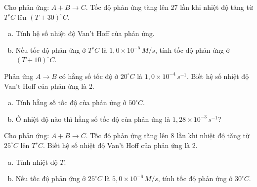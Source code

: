 \documentclass[Main.tex]{subfiles}
\begin{document}
\begin{bt}
	Cho phản ứng: $A + B \rightarrow C$. Tốc độ phản ứng tăng lên 27 lần khi nhiệt độ tăng từ $T^\circ C$ lên $(T+30)^\circ C$.
	\begin{enumerate}[a)]
		\item Tính hệ số nhiệt độ Van't Hoff của phản ứng.
		\item Nếu tốc độ phản ứng ở $T^\circ C$ là $1{,}0 \times 10^{-5} \, M/s$, tính tốc độ phản ứng ở $(T+10)^\circ C$.
	\end{enumerate}
\end{bt}

\begin{bt}
	Phản ứng $A \rightarrow B$ có hằng số tốc độ ở $20^\circ C$ là $1{,}0 \times 10^{-4} \, s^{-1}$. Biết hệ số nhiệt độ Van't Hoff của phản ứng là 2.
	\begin{enumerate}[a)]
		\item Tính hằng số tốc độ của phản ứng ở $50^\circ C$.
		\item Ở nhiệt độ nào thì hằng số tốc độ của phản ứng là $1{,}28 \times 10^{-3} \, s^{-1}$?
	\end{enumerate}
\end{bt}

\begin{bt}
	Cho phản ứng: $A + B \rightarrow C$. Tốc độ phản ứng tăng lên 8 lần khi nhiệt độ tăng từ $25^\circ C$ lên $T^\circ C$. Biết hệ số nhiệt độ Van't Hoff của phản ứng là 2.
	\begin{enumerate}[a)]
		\item Tính nhiệt độ $T$.
		\item Nếu tốc độ phản ứng ở $25^\circ C$ là $5{,}0 \times 10^{-6} \, M/s$, tính tốc độ phản ứng ở $30^\circ C$.
	\end{enumerate}
\end{bt}
\end{document}
